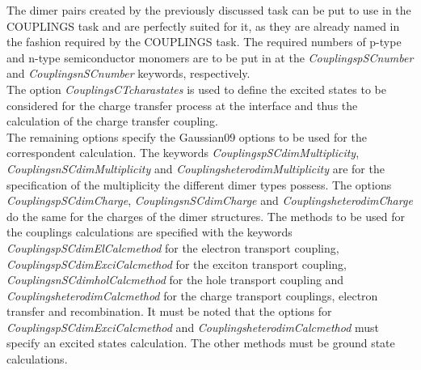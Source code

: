 \documentclass[10pt,a4paper]{article} %
\begin{document}
	The dimer pairs created by the previously discussed task can be put to use in the COUPLINGS task and are perfectly suited for it, as they are already named in the fashion required by the COUPLINGS task. The required numbers of p-type and n-type semiconductor monomers are to be put in at the \textit{CouplingspSCnumber} and \textit{CouplingsnSCnumber} keywords, respectively.\\
The option \textit{CouplingsCTcharastates} is used to define the excited states to be considered for the charge transfer process at the interface and thus the calculation of the charge transfer coupling.\\
The remaining options specify the Gaussian09\supercite{M.J.Frisch2009} options to be used for the correspondent calculation. The keywords \textit{CouplingspSCdimMultiplicity}, \textit{CouplingsnSCdimMultiplicity} and \textit{CouplingsheterodimMultiplicity} are for the specification of the multiplicity the different dimer types possess. The options \textit{CouplingspSCdimCharge}, \textit{CouplingsnSCdimCharge} and \textit{CouplingsheterodimCharge} do the same for the charges of the dimer structures.
The methods to be used for the couplings calculations are specified with the keywords \textit{CouplingspSCdimElCalcmethod} for the electron transport coupling, \textit{CouplingspSCdimExciCalcmethod} for the exciton transport coupling, \textit{CouplingsnSCdimholCalcmethod} for the hole transport coupling and \textit{CouplingsheterodimCalcmethod} for the charge transport couplings, electron transfer and recombination. It must be noted that the options for \textit{CouplingspSCdimExciCalcmethod} and \textit{CouplingsheterodimCalcmethod} must specify an excited states calculation. The other methods must be ground state calculations.\\
\end{document}

